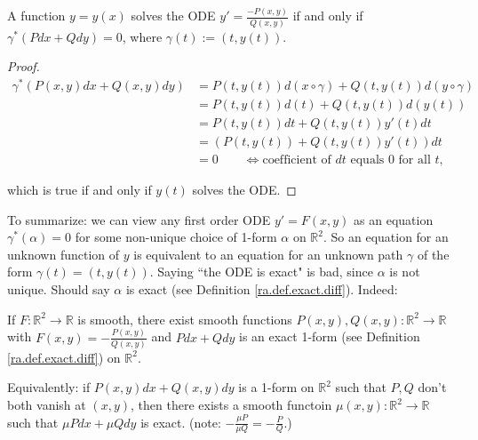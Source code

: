 \begin{proposition}

A function \(y = y(x)\) solves the ODE \(y' = \frac{- P(x,y)}{Q(x,y)}\) if and only if \(\gamma^*(P dx + Q dy) = 0\), where \(\gamma(t) := (t,y(t))\).

\end{proposition}

\begin{proof}

\begin{align*}
\gamma^*(P(x,y) dx + Q(x,y)dy) & = P(t, y(t)) d(x \circ \gamma) + Q(t, y(t)) d(y \circ \gamma) 
\\ & = P(t, y(t)) d(t) + Q(t, y(t)) d(y(t)) 
\\ & = P(t, y(t)) dt + Q(t, y(t)) y'(t) dt
\\ & =  \left( P(t, y(t)) + Q(t, y(t)) y'(t) \right) dt
\\ & = 0 \qquad \iff \text{coefficient of \(dt\) equals 0 for all \(t\)},
\end{align*}

which is true if and only if \(y(t)\) solves the ODE.

\end{proof}

To summarize: we can view any first order ODE \(y' = F(x,y)\) as an equation \(\gamma^*(\alpha) = 0\) for some non-unique choice of 1-form \(\alpha\) on \(\mathbb{R}^2\). So an equation for an unknown function of \(y\) is equivalent to an equation for an unknown path \(\gamma\) of the form \(\gamma(t) = (t, y(t))\). Saying ``the ODE is exact" is bad, since \(\alpha\) is not unique. Should say \(\alpha\) is exact (see Definition \ref{ra.def.exact.diff}). Indeed:

\begin{theorem}

If \(F: \mathbb{R}^2 \to \mathbb{R}\) is smooth, there exist smooth functions \(P(x,y), Q(x,y): \mathbb{R}^2 \to \mathbb{R}\) with \(F(x,y) = - \frac{P(x,y)}{Q(x,y)}\) and \(P dx + Q dy\) is an exact 1-form (see Definition \ref{ra.def.exact.diff}) on \(\mathbb{R}^2\). 

Equivalently: if \(P(x,y) dx + Q(x,y) dy\) is a 1-form on \(\mathbb{R}^2\) such that \(P, Q\) don't both vanish at \((x,y)\), then there exists a smooth functoin \(\mu(x,y): \mathbb{R}^2 \to \mathbb{R}\) such that \(\mu P dx + \mu Q dy\) is exact. (note: \(- \frac{\mu P}{\mu Q} = - \frac{P}{Q}\).)

\end{theorem}

